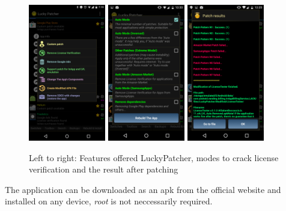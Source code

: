 \begin{figure}[h]
    \centering
    \includegraphics[width=0.3\textwidth]{data/luckyFeatures.png}
    \includegraphics[width=0.3\textwidth]{data/luckyModi.png}
    \includegraphics[width=0.3\textwidth]{data/luckyPatching.png}
    \caption{Left to right: Features offered LuckyPatcher, modes to crack license verification and the result after patching}
    \label{fig:luckyScreen}
\end{figure}
\newline
The application can be downloaded as an \gls{apk} from the official website \cite{luckyPatcherOfficial} and installed on any device, \textit{root} is not neccessarily required.
